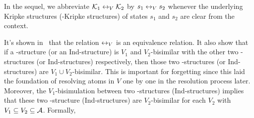 \documentclass[letterpaper]{article}
\begin{document}
 In the sequel, we abbreviate ${\cal K}_1 \leftrightarrow_V {\cal K}_2$
 by $s_1 \leftrightarrow_V s_2 $
 whenever the underlying Kripke structures (\Ind-Kripke structures) of states $s_1$ and $s_2$ are clear from the context.





It's shown in~\cite{renyansfirstpaper} that the relation $\leftrightarrow_V$ is an equivalence relation.
It also show that if a \MPK-structure (or an Ind-structure) is $V_1$ and $V_2$-bisimilar with the other two \MPK-structures (or Ind-structures) respectively, then those two \MPK-structures (or Ind-structures) are $V_1 \cup V_2$-bisimilar. This is important for forgetting since this laid the foundation of resolving atoms in $V$ one by one in the resolution process later.
Moreover, the $V_1$-bisimulation between two \MPK-structures (Ind-structures) implies that these two \MPK-structure (Ind-structures) are $V_2$-bisimilar for each $V_2$ with $V_1 \subseteq V_2 \subseteq {\cal A}$.
Formally,
\end{document}
